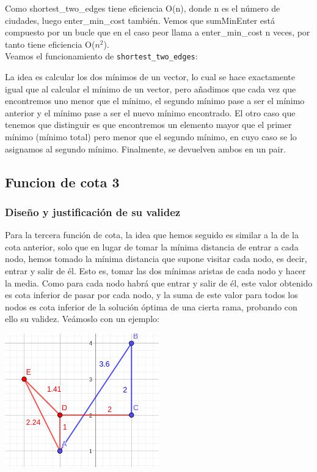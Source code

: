 \documentclass{article}
\begin{document}


Como shortest\_two\_edges tiene eficiencia O(n), donde n es el número de ciudades, luego enter\_min\_cost también. Vemos que sumMinEnter está compuesto por un bucle que en el caso peor llama a enter\_min\_cost n veces, por tanto tiene eficiencia O($n^2$). \\

Veamos el funcionamiento de \verb|shortest_two_edges|:



La idea es calcular los dos mínimos de un vector, lo cual se hace exactamente igual que al calcular el mínimo de un vector, pero añadimos que cada vez que encontremos uno menor que el mínimo, el segundo mínimo pase a ser el mínimo anterior y el mínimo pase a ser el nuevo mínimo encontrado. El otro caso que tenemos que distinguir es que encontremos un elemento mayor que el primer mínimo (mínimo total) pero menor que el segundo mínimo, en cuyo caso se lo asignamos al segundo mínimo. Finalmente, se devuelven ambos en un pair.

\subsection{Funcion de cota 3}
\subsubsection{Diseño y justificación de su validez}
Para la tercera función de cota, la idea que hemos seguido es similar a la de la cota anterior, solo que en lugar de tomar la mínima distancia de entrar a cada nodo, hemos tomado la mínima distancia que supone visitar cada nodo, es decir, entrar y salir de él. Esto es, tomar las dos mínimas aristas de cada nodo y hacer la media. Como para cada nodo habrá que entrar y salir de él, este valor obtenido es cota inferior de pasar por cada nodo, y la suma de este valor para todos los nodos es cota inferior de la solución óptima de una cierta rama, probando con ello su validez. Veámoslo con un ejemplo:

\begin{center}
    \includegraphics[width=0.5\textwidth]{imagenes/cota3/explicacion.png}
\end{center}
\end{document}
